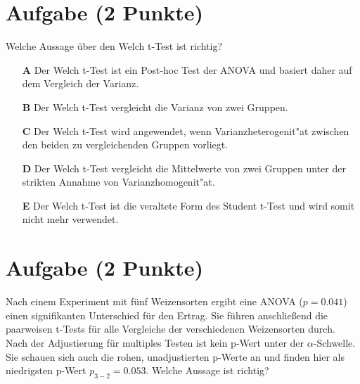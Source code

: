 \documentclass[a4paper, 10pt]{scrartcl}\usepackage[]{graphicx}\usepackage[]{xcolor}
\begin{document}
\section{Aufgabe \hfill (2 Punkte)}

Welche Aussage {\"u}ber den Welch t-Test ist richtig?



\begin{enumerate}
\item [\textbf{A} \msquare] Der Welch t-Test ist ein Post-hoc Test der ANOVA und basiert daher auf dem Vergleich der Varianz.
\item [\textbf{B} \msquare] Der Welch t-Test vergleicht die Varianz von zwei Gruppen.
\item [\textbf{C} \msquare] Der Welch t-Test wird angewendet, wenn Varianzheterogenit{"a}t zwischen den beiden zu vergleichenden Gruppen vorliegt.
\item [\textbf{D} \msquare] Der Welch t-Test vergleicht die Mittelwerte von zwei Gruppen unter der strikten Annahme von Varianzhomogenit{"a}t.
\item [\textbf{E} \msquare] Der Welch t-Test ist die veraltete Form des Student t-Test und wird somit nicht mehr verwendet.
\end{enumerate}

\section{Aufgabe \hfill (2 Punkte)}

Nach einem Experiment mit f{\"u}nf Weizensorten ergibt eine ANOVA ($p = 0.041$)
einen signifikanten Unterschied f{\"u}r den Ertrag. Sie f{\"u}hren anschlie{\ss}end die
paarweisen t-Tests f{\"u}r alle Vergleiche der verschiedenen Weizensorten
durch. Nach der Adjustierung f{\"u}r multiples Testen ist kein p-Wert unter der
$\alpha$-Schwelle. Sie schauen sich auch die rohen, unadjustierten p-Werte
an und finden hier als niedrigsten p-Wert $p_{3-2} = 0.053$. Welche Aussage
ist richtig? 
\end{document}
